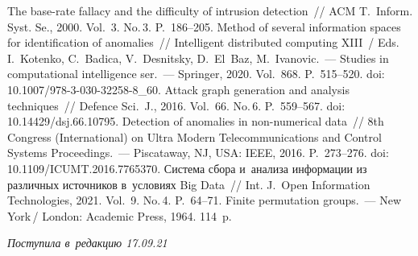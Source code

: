 \begin{multicols}{2}
{{\begin{thebibliography}{99}
 The base-rate fallacy and the difficulty of intrusion detection~// ACM T.~Inform. Syst.
Se., 2000. Vol.~3. No.\,3. P.~186--205.
 Method of several information spaces for identification of 
anomalies~// Intelligent distributed computing XIII~/ Eds. I.~Kotenko, C.~Badica, V.~Desnitsky, 
D.~El~Baz, M.~Ivanovic.~--- Studies in computational intelligence ser.~--- Springer, 2020. Vol.~868. 
P.~515--520. doi: 10.1007/978-3-030-32258-8\_60.
 Attack graph generation and analysis techniques~// 
Defence Sci.~J., 2016. Vol.~66. No.\,6. P.~559--567. doi: 10.14429/dsj.66.10795.
 Detection of anomalies in non-numerical data~// 8th  
Congress (International) on Ultra Modern Telecommunications and Control Systems Proceedings.~--- 
Piscataway, NJ, USA: IEEE, 2016. P.~273--276. doi: 10.1109/ICUMT.2016.7765370.
 Система сбора и~анализа 
информации из различных источников в~условиях Big Data~// Int. J.~Open Information 
Technologies, 2021. Vol.~9. No.\,4. P.~64--71. 
 Finite permutation groups.~--- New York\,/ London: Academic Press, 1964. 114~p.
\end{thebibliography}

 }
 }

\end{multicols}

\vspace*{-3pt}

\hfill{\small\textit{Поступила в~редакцию 17.09.21}}



\newpage

\vspace*{-28pt}






\def\tit{STATISTICS AND CLUSTERS FOR~DETECTION OF~ANOMALOUS INSERTIONS IN~BIG 
DATA ENVIRONMENT}


